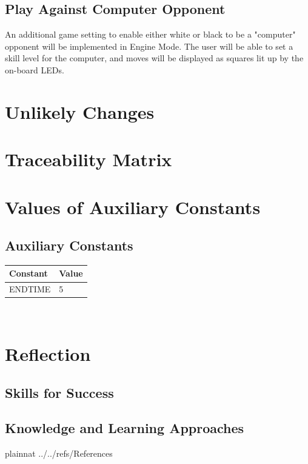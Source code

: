 \documentclass[12pt]{article}
\begin{document}
\subsection{Play Against Computer Opponent}{
    An additional game setting to enable either white or black to be a "computer" opponent will be implemented in Engine Mode. The user will be able to set a skill level
    for the computer, and moves will be displayed as squares lit up by the on-board LEDs.
}

\section{Unlikely Changes}

\section{Traceability Matrix}

\appendix
\section{Values of Auxiliary Constants}
\subsection{Auxiliary Constants}
\begin{tabular}{l l} 
  \toprule		
  \textbf{Constant} & \textbf{Value}\\
  \midrule 
  ENDTIME & 5\\
  \bottomrule
\end{tabular}\\

\newpage

\appendix
\section{Reflection}
\subsection{Skills for Success}
\subsection{Knowledge and Learning Approaches}

\newpage

 {plainnat}
 {../../refs/References}
\end{document}
